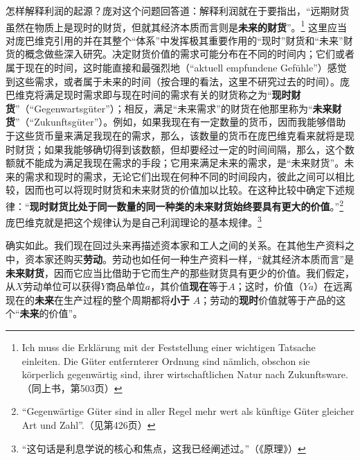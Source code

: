 \documentclass[fontset=fandol, a4paper, 12pt, openright]{ctexbook}
\begin{document}
怎样解释利润的起源？庞对这个问题回答道：解释利润就在于要指出，“远期财货虽然在物质上是现时的财货，但就其经济本质而言则是\textbf{未来的财货}”。\footnote{Ich muss die Erkl\"{a}rung mit der Feststellung einer wichtigen Tatsache einleiten. Die G\"{u}ter entfernterer Ordnung sind n\"{a}mlich, obschon sie k\"{o}rperlich gegenw\"{a}rtig sind, ihrer wirtschaftlichen Natur nach Zukunftsware.（同上书，第503页）} 这里应当对庞巴维克引用的并在其整个“体系”中发挥极其重要作用的“现时”财货和“未来”财货的概念做些深入研究。决定财货价值的需求可能分布在不同的时间内；它们或者属于现在的时间，这时能直接和最强烈地（“aktuell empfundene Gef\"{u}hle”）感觉到这些需求，或者属于未来的时间（按合理的看法，这里不研究过去的时间）。庞巴维克将满足现时需求即与现在时间的需求有关的财货称之为“\textbf{现时财货}”（“Gegenwartsg\"{u}ter”）；相反，满足“未来需求”的财货在他那里称为“\textbf{未来财货}”（“Zukunftsg\"{u}ter”）。例如，如果我现在有一定数量的货币，因而我能够借助于这些货币量来满足我现在的需求，那么，该数量的货币在庞巴维克看来就将是现时财货；如果我能够确切得到该数额，但却要经过一定的时间间隔，那么，这个数额就不能成为满足我现在需求的手段；它用来满足未来的需求，是“未来财货”。未来的需求和现时的需求，无论它们出现在何种不同的时间段内，彼此之间可以相比较，因而也可以将现时财货和未来财货的价值加以比较。在这种比较中确定下述规律：“\textbf{现时财货比处于同一数量的同一种类的未来财货始终要具有更大的价值}。”\footnote{``Gegenw\"{a}rtige G\"{u}ter sind in aller Regel mehr wert als k\"{u}nftige G\"{u}ter gleicher Art und Zahl''.（见第426页）} 庞巴维克就是把这个规律认为是自己利润理论的基本规律。\footnote{“这句话是利息学说的核心和焦点，这我已经阐述过。”（《原理》）}

确实如此。我们现在回过头来再描述资本家和工人之间的关系。在其他生产资料之中，资本家还购买\textbf{劳动}。劳动也如任何一种生产资料一样，“就其经济本质而言”是\textbf{未来财货}，因而它应当比借助于它而生产的那些财货具有更少的价值。我们假定，从$X$劳动单位可以获得$Y$商品单位$a$，其价值\textbf{现在}等于$A$；这时，价值（$Ya$）在远离现在的\textbf{未来}在生产过程的整个周期都将\textbf{小于} $A$；劳动的\textbf{现时}价值就等于产品的这个“\textbf{未来}的价值”。
\end{document}
